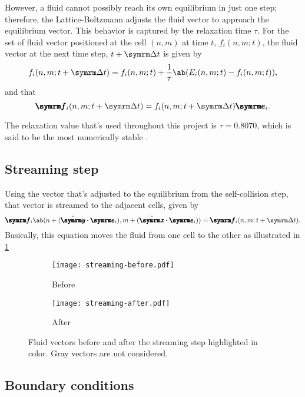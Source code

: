 However, a fluid cannot possibly reach its own equilibrium in just one step; therefore, the Lattice-Boltzmann adjusts the fluid vector to approach the equilibrium vector. This behavior is captured by the relaxation time $\tau$. For the set of fluid vector positioned at the cell $(n, m)$ at time $t$, $f_i(n, m; t)$, the fluid vector at the next time step, $t + \Dd{t}$ is given by
\begin{equation}
	f_i(n, m; t + \Dd{t}) = f_i(n, m; t) + \frac{1}{\tau}\ab(E_i(n, m; t) - f_i(n, m; t)), \label{eq:self-collision-calculation-2}
\end{equation}
and that
\begin{equation}
	\vv{f}_i(n, m; t + \Dd{t}) = f_i(n, m; t + \Dd{t})\vv{e}_i.
\end{equation}

The relaxation value that's used throughout this project is $\tau = 0.8070$, which is said to be the most numerically stable \cite{zhao-2013}.

\subsection{Streaming step}

Using the vector that's adjusted to the equilibrium from the self-collision step, that vector is streamed to the adjacent cells, given by
\begin{equation}
	\vv{f}_i\ab(n + (\yhat \vdot \vv{e}_i), m + (\xhat \vdot \vv{e}_i)) = \vv{f}_i(n, m; t + \Dd{t}).
\end{equation}
Basically, this equation moves the fluid from one cell to the other as illustrated in \cref{fig:streaming-step}
\begin{figure}
	\centering
	\begin{subfigure}{0.45\textwidth}
		\centering
		\texttt{[image: streaming-before.pdf]}
		\caption{Before}
	\end{subfigure}
	\begin{subfigure}{0.45\textwidth}
		\centering
		\texttt{[image: streaming-after.pdf]}
		\caption{After}
	\end{subfigure}
	\caption{Fluid vectors before and after the streaming step highlighted in color. Gray vectors are not considered.}
	\label{fig:streaming-step}
\end{figure}

\subsection{Boundary conditions}

